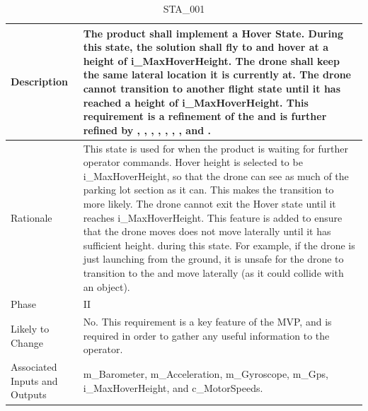 \documentclass{article}
\begin{document}
\begin{table}[!h]
\begin{center}
\caption {STA\_001} 
\label{STA_001}
\begin{tabular}{ | m{3cm} | m{11cm} | }
\hline
Description & The product shall implement a Hover State. During this state, the solution shall fly to and hover at a height of i\_MaxHoverHeight. The drone shall keep the same lateral location it is currently at. The drone cannot transition to another flight state until it has reached a height of i\_MaxHoverHeight. This requirement is a refinement of the \nameref{Hover State} and is further refined by \nameref{PERF_002}, \nameref{PERF_004}, \nameref{PERF_005}, \nameref{PERF_006}, \nameref{PERF_007}, \nameref{SAFE_001}, \nameref{SAFE_003}, and \nameref{USE_003}. \\
\hline
Rationale & This state is used for when the product is waiting for further operator commands. Hover height is selected to be i\_MaxHoverHeight, so that the drone can see as much of the parking lot section as it can. This makes the transition to \nameref{Autonomous Explore State} more likely.
The drone cannot exit the Hover state until it reaches i\_MaxHoverHeight. This feature is added to ensure that the drone moves does not move laterally until it has sufficient height. during this state. For example, if the drone is just launching from the ground, it is unsafe for the drone to transition to the \nameref{Autonomous Explore State} and move laterally (as it could collide with an object).    \\
\hline
Phase & II \\
\hline
Likely to Change & No. This requirement is a key feature of the MVP, and is required in order to gather any useful information to the operator. \\
\hline
Associated Inputs and Outputs & m\_Barometer, m\_Acceleration, m\_Gyroscope, m\_Gps, i\_MaxHoverHeight, and c\_MotorSpeeds. \\
\hline
\end{tabular}
\end{center}
\end{table}
\end{document}
